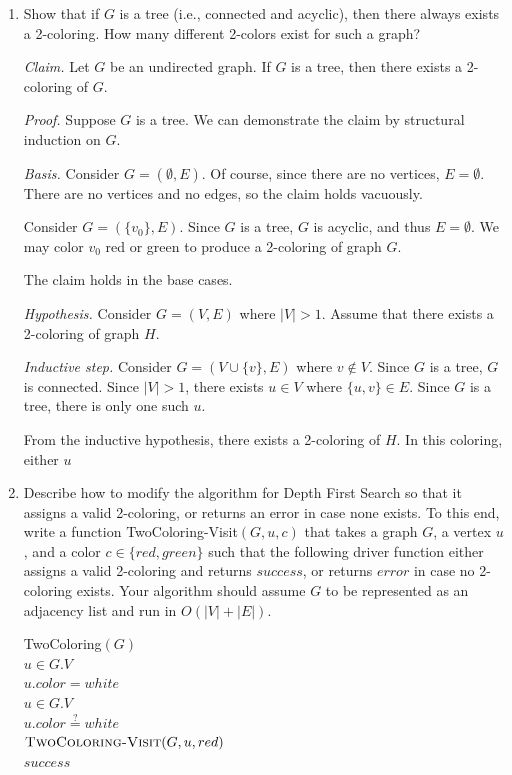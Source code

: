 \begin{enumerate}
    \item 
    Show that if $G$ is a tree (i.e., connected and acyclic), then there always exists a 2-coloring. How many different 2-colors exist for such a graph?

\begin{solution}
\textit{Claim. }Let $G$ be an undirected graph. If $G$ is a tree, then there exists a 2-coloring of $G$.

\textit{Proof. }Suppose $G$ is a tree. We can demonstrate the claim by structural induction on $G$.

\textit{Basis. }Consider $G=(\emptyset,E)$. Of course, since there are no vertices, $E=\emptyset$. There are no vertices and no edges, so the claim holds vacuously.

Consider $G=(\{v_0\},E)$. Since $G$ is a tree, $G$ is acyclic, and thus $E=\emptyset$. We may color $v_0$ red or green to produce a 2-coloring of graph $G$.

The claim holds in the base cases.

\textit{Hypothesis. }Consider $G=(V,E)$ where $|V|>1$. Assume that there exists a 2-coloring of graph $H$.

\textit{Inductive step. }Consider $G=(V\cup\{v\},E)$ where $v\notin V$. Since $G$ is a tree, $G$ is connected. Since $|V|>1$, there exists $u\in V$ where $\{u,v\}\in E$. Since $G$ is a tree, there is only one such $u$.

From the inductive hypothesis, there exists a 2-coloring of $H$. In this coloring, either $u$ 
\end{solution}


	\item 
	Describe how to modify the algorithm for Depth First Search so that it assigns a valid 2-coloring, or returns an error in case none exists. To this end, write a function {\sc TwoColoring-Visit}$(G,u,c)$ that takes a graph $G$, a vertex $u$, and a color $c \in \{red,green\}$ such that the following driver function either assigns a valid 2-coloring and returns $success$, or returns $error$ in case no 2-coloring exists. Your algorithm should assume $G$ to be represented as an adjacency list and run in $O(|V| + |E|)$. 
	
	\begin{code}
		{\sc TwoColoring}$(G)$\\
		\> \For $u \in G.V$ \Do \\
		\> \> $u.color = white$ \\
		\> \For $u \in G.V$ \Do \\
		\> \> \If $u.color \stackrel{?}{=} white$ \Then \\
		\> \> \> $\text{\sc TwoColoring-Visit}(G,u,red)$ \\
		\> \Return $success$ \\
	\end{code}


\end{enumerate}
